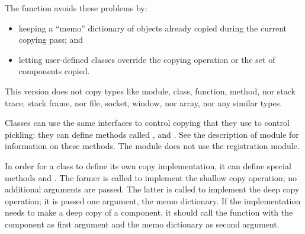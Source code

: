 The  function avoids these problems by:

\begin{itemize}

\item
keeping a ``memo'' dictionary of objects already copied during the current
copying pass; and

\item
letting user-defined classes override the copying operation or the
set of components copied.

\end{itemize}

This version does not copy types like module, class, function, method,
nor stack trace, stack frame, nor file, socket, window, nor array, nor
any similar types.

Classes can use the same interfaces to control copying that they use
to control pickling: they can define methods called
,  and
.  See the description of module
 for information on these
methods.  The  module does not use the 
registration module.

In order for a class to define its own copy implementation, it can
define special methods  and
.  The former is called to implement the
shallow copy operation; no additional arguments are passed.  The
latter is called to implement the deep copy operation; it is passed
one argument, the memo dictionary.  If the 
implementation needs to make a deep copy of a component, it should
call the  function with the component as first
argument and the memo dictionary as second argument.

\begin{seealso}
\end{seealso}
